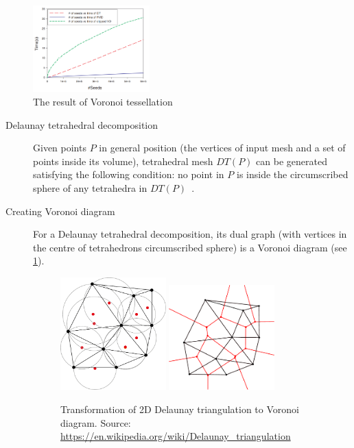 \begin{figure}
        \centering
        \includegraphics[width=0.4\textwidth]{img/clipped}
        \caption{The result of Voronoi tessellation \cite{yan2010efficient}}
        \label{fig:voro}
\end{figure}

\begin{description}
    \item[Delaunay tetrahedral decomposition] Given points $P$ in general position (the vertices of input mesh and a set of points inside its volume), tetrahedral mesh $DT(P)$ can be generated satisfying the following condition: no point in $P$ is inside the circumscribed sphere of any tetrahedra in $DT(P)$~\cite{cignoni1993parallel}.
    \item[Creating Voronoi diagram] For a Delaunay tetrahedral decomposition, its dual graph (with vertices in the centre of tetrahedrons circumscribed sphere) is a Voronoi diagram (see \cref{fig:voro}).
    
 \begin{figure}
    \centering
    \includegraphics[width=0.4\textwidth]{img/delaunay}
    \includegraphics[width=0.4\textwidth]{img/voronoi}
    \caption{Transformation of 2D Delaunay triangulation to Voronoi diagram. Source: \url{https://en.wikipedia.org/wiki/Delaunay\_triangulation}}
    \label{fig:DT}
\end{figure}


\end{description}
